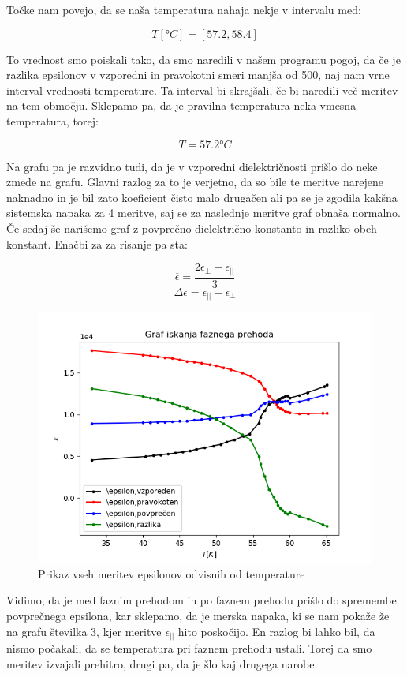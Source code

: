 \documentclass[11pt, a4paper]{article}
\theoremstyle{definition}
\theoremstyle{example}
\theoremstyle{izrek}
\begin{document}
Točke nam povejo, da se naša temperatura nahaja nekje v intervalu med:

$$ T[°C]= [57.2,58.4] $$

To vrednost smo poiskali tako, da smo naredili v našem programu pogoj, da če je razlika epsilonov v vzporedni in pravokotni smeri manjša od 500, naj nam vrne interval vrednosti temperature. Ta interval bi skrajšali, če bi naredili več meritev na tem območju. Sklepamo pa, da je pravilna temperatura neka vmesna temperatura, torej:

$$T=57.2 °C$$

Na grafu pa je razvidno tudi, da je v vzporedni dielektričnosti prišlo do neke zmede na grafu. Glavni razlog za to je verjetno, da so bile te meritve narejene naknadno in je bil zato koeficient čisto malo drugačen ali pa se je zgodila kakšna sistemska napaka za 4 meritve, saj se za naslednje meritve graf obnaša normalno. \\

Če sedaj še narišemo graf z povprečno dielektrično konstanto in razliko obeh konstant. Enačbi za za risanje pa sta: 

$$\overline{\epsilon}=\frac{2\epsilon_{\perp}+\epsilon_{||}}{3}$$
$$\Delta \epsilon=\epsilon_{||}-\epsilon_{\perp}$$

\begin{figure}[H]
	\centering
    \includegraphics[width=12cm]{Povprečni epsilon.png}
    \caption{Prikaz vseh meritev epsilonov odvisnih od temperature}
\end{figure}

Vidimo, da je med faznim prehodom in po faznem prehodu prišlo do spremembe povprečnega epsilona, kar sklepamo, da je merska napaka, ki se nam pokaže že na grafu številka 3, kjer meritve $\epsilon_{||}$ hito poskočijo. En razlog bi lahko bil, da nismo počakali, da se temperatura pri faznem prehodu ustali. Torej da smo meritev izvajali prehitro, drugi pa, da je šlo kaj drugega narobe.  
\end{document}
